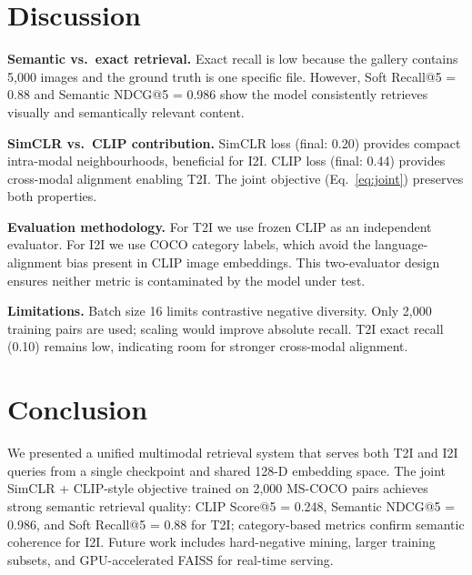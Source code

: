 \documentclass[conference]{IEEEtran}
\begin{document}
\section{Discussion}

\textbf{Semantic vs.\ exact retrieval.}
Exact recall is low because the gallery contains 5{,}000 images and the
ground truth is one specific file.
However, Soft Recall@5 = 0.88 and Semantic NDCG@5 = 0.986 show the
model consistently retrieves visually and semantically relevant content.

\textbf{SimCLR vs.\ CLIP contribution.}
SimCLR loss (final: 0.20) provides compact intra-modal neighbourhoods,
beneficial for I2I.
CLIP loss (final: 0.44) provides cross-modal alignment enabling T2I.
The joint objective (Eq.~\ref{eq:joint}) preserves both properties.

\textbf{Evaluation methodology.}
For T2I we use frozen CLIP as an independent evaluator.
For I2I we use COCO category labels, which avoid the language-alignment
bias present in CLIP image embeddings.
This two-evaluator design ensures neither metric is contaminated by the
model under test.

\textbf{Limitations.}
Batch size 16 limits contrastive negative diversity.
Only 2{,}000 training pairs are used; scaling would improve absolute
recall.
T2I exact recall (0.10) remains low, indicating room for stronger
cross-modal alignment.

\section{Conclusion}
We presented a unified multimodal retrieval system that serves both T2I
and I2I queries from a single checkpoint and shared 128-D embedding
space.
The joint SimCLR + CLIP-style objective trained on 2{,}000 MS-COCO pairs
achieves strong semantic retrieval quality:
CLIP Score@5 = 0.248, Semantic NDCG@5 = 0.986, and Soft Recall@5 = 0.88
for T2I; category-based metrics confirm semantic coherence for I2I.
Future work includes hard-negative mining, larger training subsets,
and GPU-accelerated FAISS for real-time serving.
\end{document}
